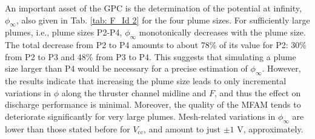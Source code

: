 \documentclass[%
 aip,
cha,
 amsmath,amssymb,
 reprint,%
]{revtex4-1}
\begin{document}
An important asset of the GPC is the determination of the potential at infinity, $\phi_\infty$, also given in Tab. \ref{tab: F_Id 2} for the four plume sizes.
%
For sufficiently large plumes, i.e., plume sizes P2-P4, $\phi_\infty$ monotonically decreases with the plume size. The total decrease from P2 to P4 amounts to about 78\% of its value for P2: 30\% from P2 to P3 and 48\% from P3 to P4. This suggests that simulating a plume size larger than P4 would be necessary for a precise estimation of $\phi_\infty$. However, the results indicate that increasing the plume size leads to only incremental variations in $\phi$ along the thruster channel midline
and $F$, and thus the effect on discharge performance is minimal. Moreover, the quality of the MFAM tends to deteriorate significantly for very large plumes. Mesh-related variations in $\phi_\infty$ are lower than those stated before for $V_\mathrm{cc}$, and amount to just $\pm 1$ V, approximately.



\begin{table}[!t]
\centering
{}
\caption{
Performance figures for plume sizes P1 to P4 with C1 and the GPC and LPC.
}
\label{tab: F_Id 2}
\end{table}
\end{document}
